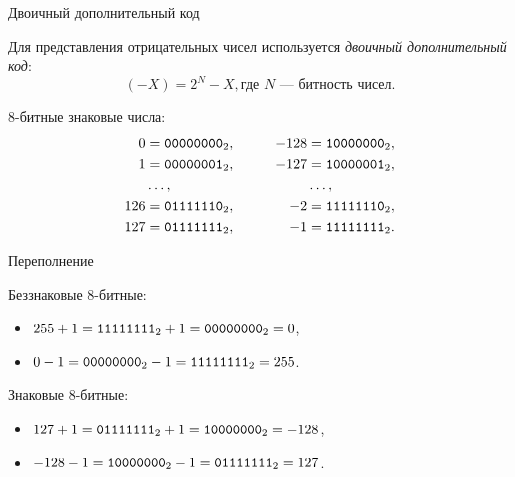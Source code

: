 \begin{frame}{Двоичный дополнительный код}

  Для представления отрицательных чисел используется \emph{двоичный
  дополнительный код}:
  \[ (-X) = 2^N - X, \text{где $N$~--- битность чисел.}\]

  8-битные знаковые числа:
  \begin{align*}
    0   &= \mathtt{0000 0000}_2,  &\qquad -128 &= \mathtt{1000 0000}_2, \\
    1   &= \mathtt{0000 0001}_2,  &\qquad -127 &= \mathtt{1000 0001}_2, \\
        &\ldots,             &\qquad      &\ldots,            \\
    126 &= \mathtt{0111 1110}_2,  &\qquad -2   &= \mathtt{1111 1110}_2, \\
    127 &= \mathtt{0111 1111}_2,  &\qquad -1   &= \mathtt{1111 1111}_2. \\
  \end{align*}


\end{frame}

\begin{frame}{Переполнение}

  \begin{block}{Беззнаковые 8-битные:}
    \begin{itemize}
      \item $255 + 1 = \mathtt{1111 1111}_2 + 1 = \mathtt{0000 0000}_2 = 0$,
      \item $0 - 1 = \mathtt{0000 0000}_2 - 1 = \mathtt{1111 1111}_2 = 255$.
    \end{itemize}
  \end{block}

  \begin{block}{Знаковые 8-битные:}
    \begin{itemize}
      \item $127 + 1 = \mathtt{0111 1111}_2 + 1 = \mathtt{1000 0000}_2 = -128$,
      \item $-128 - 1 = \mathtt{1000 0000}_2 - 1 = \mathtt{0111 1111}_2 = 127$.
    \end{itemize}
  \end{block}


\end{frame}

